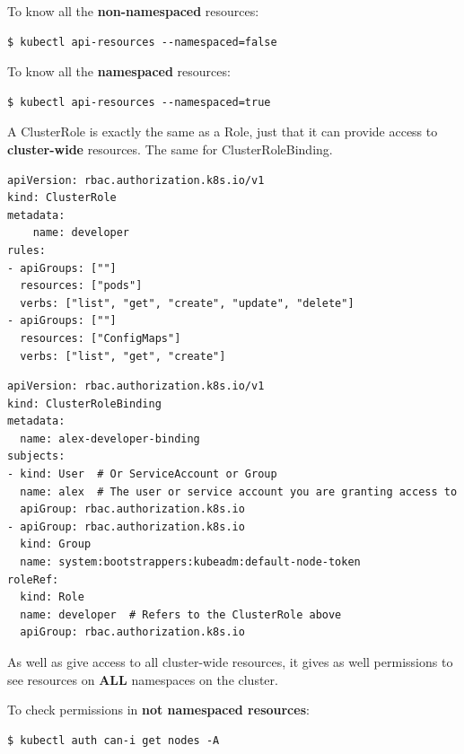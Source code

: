 \documentclass{article}
\newenvironment{blocktemplateII}[1]{%
    \tcolorbox[beamer,%
    noparskip,breakable,
    colframe=Green,%
    colbacklower=LimeGreen!75!LightGreen,%
    title=#1]}%
    {\endtcolorbox}
\newenvironment{codetemplate}[1][]{%
  \mybasecolorbox[#1]
  \itshape
}{%
  \endmybasecolorbox
}
\begin{document}
To know all the \textbf{non-namespaced} resources:
\begin{codetemplate}{}
\begin{verbatim}
$ kubectl api-resources --namespaced=false
\end{verbatim}
\end{codetemplate}

To know all the \textbf{namespaced} resources:
\begin{codetemplate}{}
\begin{verbatim}
$ kubectl api-resources --namespaced=true
\end{verbatim}
\end{codetemplate}

A ClusterRole is exactly the same as a Role, just that it can provide access to \textbf{cluster-wide} resources. The same for ClusterRoleBinding.

\begin{codetemplate}{}
\begin{verbatim}
apiVersion: rbac.authorization.k8s.io/v1
kind: ClusterRole
metadata:
    name: developer
rules:
- apiGroups: [""]
  resources: ["pods"]
  verbs: ["list", "get", "create", "update", "delete"]
- apiGroups: [""]
  resources: ["ConfigMaps"]
  verbs: ["list", "get", "create"]
\end{verbatim}
\end{codetemplate}

\begin{codetemplate}{}
\begin{verbatim}
apiVersion: rbac.authorization.k8s.io/v1
kind: ClusterRoleBinding
metadata:
  name: alex-developer-binding
subjects:
- kind: User  # Or ServiceAccount or Group
  name: alex  # The user or service account you are granting access to
  apiGroup: rbac.authorization.k8s.io
- apiGroup: rbac.authorization.k8s.io
  kind: Group
  name: system:bootstrappers:kubeadm:default-node-token
roleRef:
  kind: Role
  name: developer  # Refers to the ClusterRole above
  apiGroup: rbac.authorization.k8s.io
\end{verbatim}
\end{codetemplate}

\begin{blocktemplateII}{NOTE}
As well as give access to all cluster-wide resources, it gives as well permissions to see resources on \textbf{ALL} namespaces on the cluster.
\end{blocktemplateII}

To check permissions in \textbf{not namespaced resources}:
\begin{codetemplate}{}
\begin{verbatim}
$ kubectl auth can-i get nodes -A
\end{verbatim}
\end{codetemplate}
\end{document}
